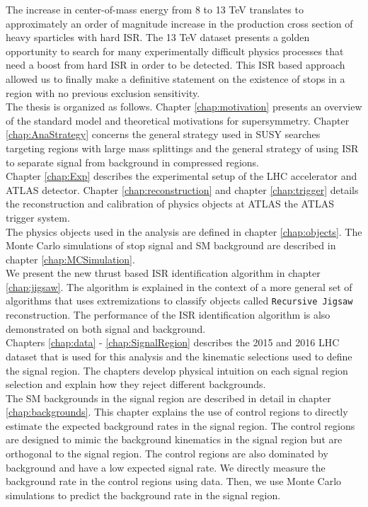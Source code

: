 \indent  The increase in center-of-mass energy from 8 to 13 TeV translates to approximately an order of magnitude increase in the production cross section of heavy sparticles with hard ISR.  The 13 TeV dataset presents a golden opportunity to search for many experimentally difficult physics processes that need a boost from hard ISR in order to be detected.  This ISR based approach allowed us to finally make a definitive statement on the existence of stops in a region with no previous exclusion sensitivity.  \\

\indent The thesis is organized as follows.  Chapter \ref{chap:motivation} presents an overview of the standard model and theoretical motivations for supersymmetry. Chapter \ref{chap:AnaStrategy} concerns the general strategy used in SUSY searches targeting regions with large mass splittings and the general strategy of using ISR to separate signal from background in compressed regions.  \\

\indent Chapter \ref{chap:Exp} describes the experimental setup of the LHC accelerator and ATLAS detector.   Chapter \ref{chap:reconstruction} and chapter \ref{chap:trigger} details the reconstruction and calibration of physics objects at ATLAS the ATLAS trigger system.  \\

\indent The physics objects used in the analysis are defined in chapter \ref{chap:objects}.  The Monte Carlo simulations of stop signal and SM background are described in chapter \ref{chap:MCSimulation}.  \\ 

\indent We present the new thrust based ISR identification algorithm in chapter \ref{chap:jigsaw}.  The algorithm is explained in the context of a more general set of algorithms that uses extremizations to classify objects called {\tt Recursive Jigsaw} reconstruction.  The performance of the ISR identification algorithm is also demonstrated on both signal and background. \\

\indent Chapters \ref{chap:data} - \ref{chap:SignalRegion} describes the 2015 and 2016 LHC dataset that is used for this analysis and the kinematic selections used to define the signal region.  The chapters develop physical intuition on each signal region selection and explain how they reject different backgrounds.  \\

\indent The SM backgrounds in the signal region are described in detail in chapter \ref{chap:backgrounds}.  This chapter explains the use of control regions to directly estimate the expected background rates in the signal region.  The control regions are designed to mimic the background kinematics in the signal region but are orthogonal to the signal region. The control regions are also dominated by background and have a low expected signal rate.  We directly measure the background rate in the control regions using data.  Then, we use Monte Carlo simulations to predict the background rate in the signal region. \\

